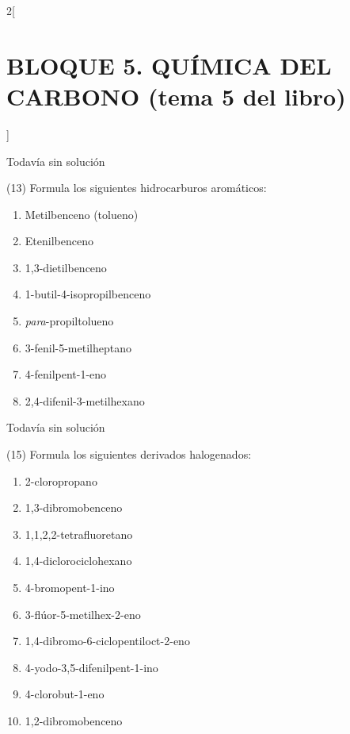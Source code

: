 \documentclass[10pt]{article}
\begin{document}
\begin{multicols}{2}[
  \section{BLOQUE 5. QUÍMICA DEL CARBONO (tema 5 del libro)}
  ]
\begin{solution}[print=false]
  Todavía sin solución
\end{solution}




\begin{exercise}[
    tags    = {},
    topics  = {química, química orgánica, orgánica},
    source  = {FQ 1B MGH 2016, p132, e13},
  ]
  (13) Formula los siguientes hidrocarburos aromáticos:
  \begin{enumerate}
    \item Metilbenceno (tolueno)
    \item Etenilbenceno
    \item 1,3-dietilbenceno
    \item 1-butil-4-isopropilbenceno
    \item \textit{para}-propiltolueno
    \item 3-fenil-5-metilheptano
    \item 4-fenilpent-1-eno
    \item 2,4-difenil-3-metilhexano
  \end{enumerate}
\end{exercise}

\begin{solution}[print=false]
  Todavía sin solución
\end{solution}




\begin{exercise}[
    tags    = {},
    topics  = {química, química orgánica, orgánica},
    source  = {FQ 1B MGH 2016, p133, e15},
  ]
  (15) Formula los siguientes derivados halogenados:
  \begin{enumerate}
    \item 2-cloropropano
    \item 1,3-dibromobenceno
    \item 1,1,2,2-tetrafluoretano
    \item 1,4-diclorociclohexano
    \item 4-bromopent-1-ino
    \item 3-flúor-5-metilhex-2-eno
    \item 1,4-dibromo-6-ciclopentiloct-2-eno
    \item 4-yodo-3,5-difenilpent-1-ino
    \item 4-clorobut-1-eno
    \item 1,2-dibromobenceno
  \end{enumerate}
\end{exercise}


\end{multicols}
\end{document}
